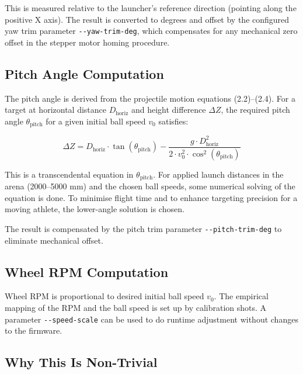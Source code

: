 This is measured relative to the launcher's reference direction (pointing along the positive X axis). The result is converted to degrees and offset by the configured yaw trim parameter \texttt{-{}-yaw-trim-deg}, which compensates for any mechanical zero offset in the stepper motor homing procedure.

\subsection{Pitch Angle Computation}

The pitch angle is derived from the projectile motion equations (2.2)--(2.4). For a target at horizontal distance $D_{\text{horiz}}$ and height difference $\Delta Z$, the required pitch angle $\theta_{\text{pitch}}$ for a given initial ball speed $v_0$ satisfies:

\begin{equation}
\Delta Z = D_{\text{horiz}} \cdot \tan(\theta_{\text{pitch}}) - \frac{g \cdot D_{\text{horiz}}^2}{2 \cdot v_0^2 \cdot \cos^2(\theta_{\text{pitch}})} \label{eq:3_6}
\end{equation}

This is a transcendental equation in $\theta_{\text{pitch}}$. For applied launch distances in the arena (2000--5000 mm) and the chosen ball speeds, some numerical solving of the equation is done. To minimise flight time and to enhance targeting precision for a moving athlete, the lower-angle solution is chosen.

The result is compensated by the pitch trim parameter \texttt{-{}-pitch-trim-deg} to eliminate mechanical offset.

\subsection{Wheel RPM Computation}

Wheel RPM is proportional to desired initial ball speed $v_0$. The empirical mapping of the RPM and the ball speed is set up by calibration shots. A parameter \texttt{-{}-speed-scale} can be used to do runtime adjustment without changes to the firmware.

\subsection{Why This Is Non-Trivial}

